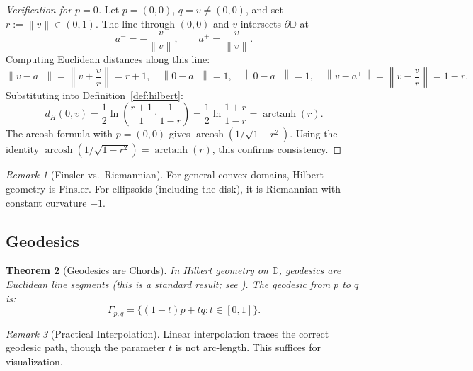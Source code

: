 \documentclass[11pt]{article}
\theoremstyle{plain}
\newtheorem{theorem}{Theorem}[section]
\theoremstyle{definition}
\theoremstyle{remark}
\newtheorem{remark}[theorem]{Remark}
\newcommand{\D}{\mathbb{D}}
\newcommand{\norm}[1]{\left\lVert #1 \right\rVert}
\DeclareMathOperator{\arctanh}{arctanh}
\DeclareMathOperator{\arcosh}{arcosh}
\begin{document}
\begin{proof}[Verification for $p = 0$]
Let $p = (0,0)$, $q = v \neq (0,0)$, and set $r := \norm{v} \in (0, 1)$. The line through $(0,0)$ and $v$ intersects $\partial\D$ at
\begin{equation}
a^- = -\frac{v}{\norm{v}}, \qquad a^+ = \frac{v}{\norm{v}}.
\end{equation}
Computing Euclidean distances along this line:
\begin{equation}
\norm{v - a^-} = \left\| v + \frac{v}{r} \right\| = r + 1, \quad
\norm{0 - a^-} = 1, \quad
\norm{0 - a^+} = 1, \quad
\norm{v - a^+} = \left\| v - \frac{v}{r} \right\| = 1 - r.
\end{equation}
Substituting into Definition~\ref{def:hilbert}:
\begin{equation}
d_H(0, v) = \frac{1}{2} \ln\left( \frac{r + 1}{1} \cdot \frac{1}{1 - r} \right) = \frac{1}{2} \ln \frac{1 + r}{1 - r} = \arctanh(r).
\end{equation}
The arcosh formula with $p = (0,0)$ gives $\arcosh(1/\sqrt{1-r^2})$. Using the identity $\arcosh(1/\sqrt{1-r^2}) = \arctanh(r)$, this confirms consistency.
\end{proof}

\begin{remark}[Finsler vs.\ Riemannian]
For general convex domains, Hilbert geometry is Finsler. For ellipsoids (including the disk), it is Riemannian with constant curvature $-1$.
\end{remark}

\subsection{Geodesics}

\begin{theorem}[Geodesics are Chords]
\label{thm:geodesics}
In Hilbert geometry on $\D$, geodesics are Euclidean line segments (this is a standard result; see \cite{Berthier2020}). The geodesic from $p$ to $q$ is:
\begin{equation}
\Gamma_{p,q} = \{(1-t)p + tq : t \in [0,1]\}.
\end{equation}
\end{theorem}

\begin{remark}[Practical Interpolation]
Linear interpolation traces the correct geodesic path, though the parameter $t$ is not arc-length. This suffices for visualization.
\end{remark}
\end{document}
